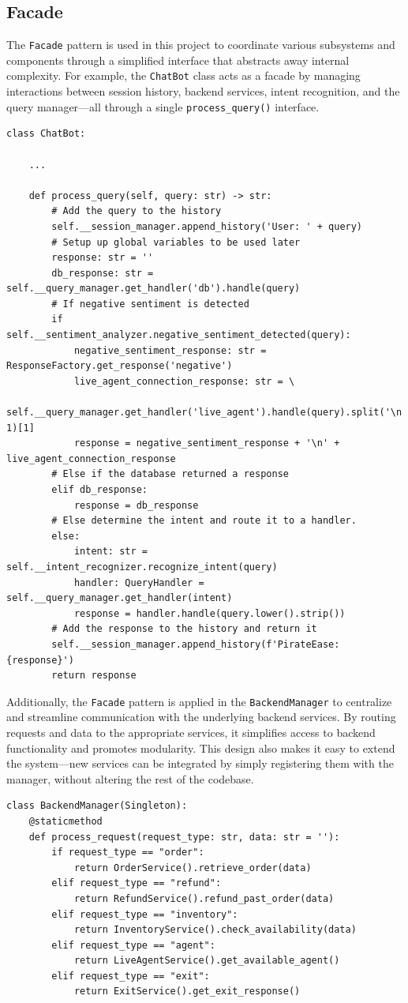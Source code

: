 \documentclass[11pt]{article}
\begin{document}
\subsection{Facade}
%
The \texttt{Facade} pattern is used in this project to coordinate various subsystems and components through a simplified interface that abstracts away internal complexity. For example, the \texttt{ChatBot} class acts as a facade by managing interactions between session history, backend services, intent recognition, and the query manager—all through a single \texttt{process\_query()} interface.
%
\begin{lstlisting}
class ChatBot:
	
	...
	
    def process_query(self, query: str) -> str:
        # Add the query to the history
        self.__session_manager.append_history('User: ' + query)
        # Setup up global variables to be used later
        response: str = ''
        db_response: str = self.__query_manager.get_handler('db').handle(query)
        # If negative sentiment is detected
        if self.__sentiment_analyzer.negative_sentiment_detected(query):
            negative_sentiment_response: str = ResponseFactory.get_response('negative')
            live_agent_connection_response: str = \
            self.__query_manager.get_handler('live_agent').handle(query).split('\n', 1)[1]
            response = negative_sentiment_response + '\n' + live_agent_connection_response
        # Else if the database returned a response
        elif db_response:
            response = db_response
        # Else determine the intent and route it to a handler.
        else:
            intent: str = self.__intent_recognizer.recognize_intent(query)
            handler: QueryHandler = self.__query_manager.get_handler(intent)
            response = handler.handle(query.lower().strip())
        # Add the response to the history and return it
        self.__session_manager.append_history(f'PirateEase: {response}')
        return response
\end{lstlisting}
%
Additionally, the \texttt{Facade} pattern is applied in the \texttt{BackendManager} to centralize and streamline communication with the underlying backend services. By routing requests and data to the appropriate services, it simplifies access to backend functionality and promotes modularity. This design also makes it easy to extend the system—new services can be integrated by simply registering them with the manager, without altering the rest of the codebase.
%
\begin{lstlisting}
class BackendManager(Singleton):
    @staticmethod
    def process_request(request_type: str, data: str = ''):
        if request_type == "order":
            return OrderService().retrieve_order(data)
        elif request_type == "refund":
            return RefundService().refund_past_order(data)
        elif request_type == "inventory":
            return InventoryService().check_availability(data)
        elif request_type == "agent":
            return LiveAgentService().get_available_agent()
        elif request_type == "exit":
            return ExitService().get_exit_response()
\end{lstlisting}
\end{document}
